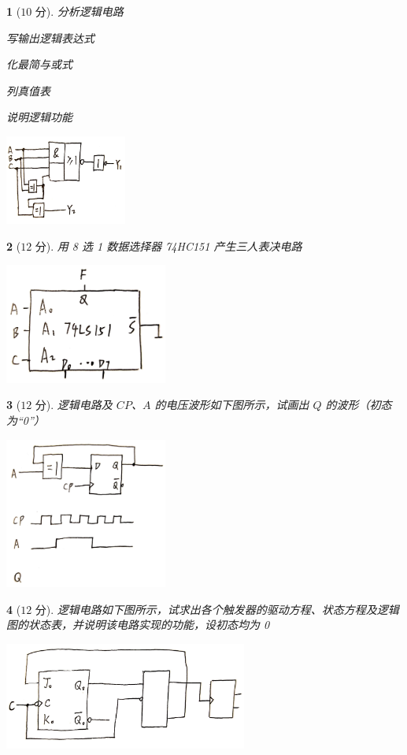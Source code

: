 \documentclass{ctexart}
\theoremstyle{change}
\newtheorem{ti}{}[section]
\begin{document}
	\begin{ti}[$10$ 分]
		分析逻辑电路
		\begin{inparaenum}
			\item 写输出逻辑表达式
			\item 化最简与或式
			\item 列真值表
			\item 说明逻辑功能
		\end{inparaenum}
		\begin{center}
			\includegraphics[width=0.3\textwidth]{fig4.jpg}
		\end{center}
	\end{ti}
	
	\begin{ti}[$12$ 分]
		用 8 选 1 数据选择器 74HC151 产生三人表决电路
		\begin{center}
			\includegraphics[width=0.4\textwidth]{fig5.jpg}
		\end{center}
	\end{ti}

	\begin{ti}[$12$ 分]
		逻辑电路及 $CP$、$A$ 的电压波形如下图所示，试画出 $Q$ 的波形（初态为“0”）
		\begin{center}
			\includegraphics[width=0.4\textwidth]{fig6.jpg}
		\end{center}
	\end{ti}

	\begin{ti}[$12$ 分]
		逻辑电路如下图所示，试求出各个触发器的驱动方程、状态方程及逻辑图的状态表，并说明该电路实现的功能，设初态均为 0
		\begin{center}
			\includegraphics[width=0.6\textwidth]{fig7.jpg}
		\end{center}
	\end{ti}
\end{document}
